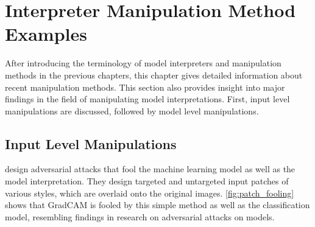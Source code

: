 \section{Interpreter Manipulation Method Examples}
\label{sec:manipulations}

After introducing the terminology of model interpreters and manipulation methods in the previous chapters, this chapter gives detailed information about recent manipulation methods. This section also provides insight into major findings in the field of manipulating model interpretations. First, input level manipulations are discussed, followed by model level manipulations. 

\subsection{Input Level Manipulations}

\newline
\cite{subramanya2019fooling} design adversarial attacks that fool the machine learning model as well as the model interpretation. 
They design targeted and untargeted input patches of various styles, which are overlaid onto the original images. 
\autoref{fig:patch_fooling} shows that GradCAM is fooled by this simple method as well as the classification model, resembling findings in research on adversarial attacks on models. 

